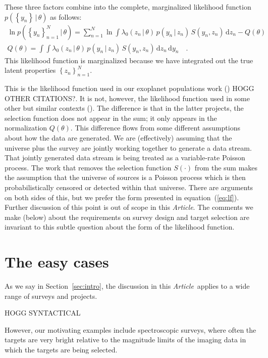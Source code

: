 \documentclass[modern]{aastex62}
\newcommand{\dd}{\mathrm{d}}
\newcommand{\given}{\,|\,}
\newcommand{\set}[1]{\left\{{#1}\right\}}
\newcommand{\documentname}{\textsl{Article}}
\newcommand{\sectionname}{Section}
\newcommand{\equationname}{equation}
\begin{document}
These three factors combine into the complete, marginalized likelihood
function $p(\set{y_n}\given\theta)$ as follows:
\begin{gather}
\ln p(\set{y_n}_{n=1}^{N}\given\theta)
 = \sum_{n=1}^N \ln\int\lambda_0(z_n\given \theta)\,p(y_n\given z_n)\,S(y_n, z_n)\,\dd z_n - Q(\theta)
\label{eq:lf}
\\
Q(\theta) = \int\!\int\lambda_0(z_n\given \theta)\,p(y_n\given z_n)\,S(y_n, z_n)\,\dd z_n\,\dd y_n
\quad .
\end{gather}
This likelihood function is marginalized because we have integrated out
the true latent properties $\set{z_n}_{n=1}^N$.

This is the likelihood function used in our exoplanet populations
work (\citealt{exopop}) HOGG OTHER CITATIONS?.
It is not, however, the likelihood function used in some other but
similar contexts (\citealt{loredogrb, loredo}).
The difference is that in the latter projects, the selection function
does not appear in the sum; it only appears in the normalization $Q(\theta)$.
This difference flows from some different assumptions about how the
data are generated.
We are (effectively) assuming that the universe plus the survey are jointly
working together to generate a data stream.
That jointly generated data stream is being treated as a variable-rate Poisson
process.
The work that removes the selection function $S(\cdot)$ from the sum
makes the assumption that the universe of sources is a Poisson process
which is then probabilistically censored or detected within that universe.
There are arguments on both sides of this, but we prefer the form
presented in \equationname~(\ref{eq:lf}).
Further discussion of this point is out of scope in this \documentname.
The comments we make (below) about the requirements on survey design
and target selection are invariant to this subtle question about the
form of the likelihood function.

\section{The easy cases}\label{sec:easy}

As we say in \sectionname~\ref{sec:intro}, the discussion in this
\documentname\ applies to a wide range of surveys and projects.

HOGG SYNTACTICAL

However, our motivating examples include spectroscopic surveys, where
often the targets are very bright relative to the magnitude limits of
the imaging data in which the targets are being selected.
\end{document}
